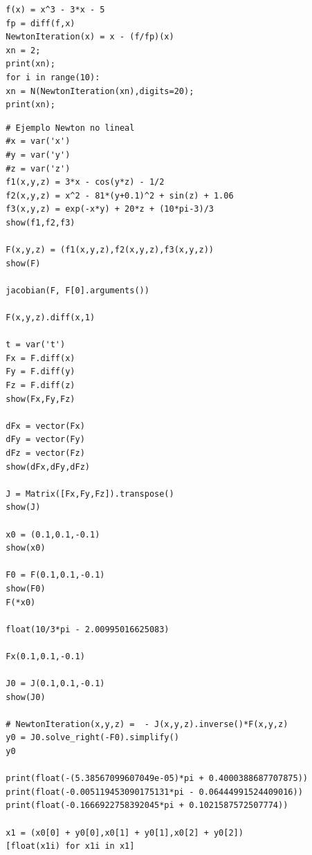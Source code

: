\begin{example}

	\begin{verbatim}
		f(x) = x^3 - 3*x - 5
		fp = diff(f,x)
		NewtonIteration(x) = x - (f/fp)(x)
		xn = 2;
		print(xn);
		for i in range(10):
		xn = N(NewtonIteration(xn),digits=20);
		print(xn);
	\end{verbatim}

\end{example}

\begin{example}
	
	\begin{verbatim}
		# Ejemplo Newton no lineal
		#x = var('x')
		#y = var('y')
		#z = var('z')
		f1(x,y,z) = 3*x - cos(y*z) - 1/2
		f2(x,y,z) = x^2 - 81*(y+0.1)^2 + sin(z) + 1.06
		f3(x,y,z) = exp(-x*y) + 20*z + (10*pi-3)/3
		show(f1,f2,f3)
		
		F(x,y,z) = (f1(x,y,z),f2(x,y,z),f3(x,y,z))
		show(F)
		
		jacobian(F, F[0].arguments())
		
		F(x,y,z).diff(x,1)
		
		t = var('t')
		Fx = F.diff(x)
		Fy = F.diff(y)
		Fz = F.diff(z)
		show(Fx,Fy,Fz)
		
		dFx = vector(Fx)
		dFy = vector(Fy)
		dFz = vector(Fz)
		show(dFx,dFy,dFz)
		
		J = Matrix([Fx,Fy,Fz]).transpose()
		show(J)
		
		x0 = (0.1,0.1,-0.1)
		show(x0)
		
		F0 = F(0.1,0.1,-0.1)
		show(F0)
		F(*x0)
		
		float(10/3*pi - 2.00995016625083)
		
		Fx(0.1,0.1,-0.1)
		
		J0 = J(0.1,0.1,-0.1)
		show(J0)
		
		# NewtonIteration(x,y,z) =  - J(x,y,z).inverse()*F(x,y,z)
		y0 = J0.solve_right(-F0).simplify()
		y0
		
		print(float(-(5.38567099607049e-05)*pi + 0.4000388687707875))
		print(float(-0.005119453090175131*pi - 0.06444991524409016))
		print(float(-0.1666922758392045*pi + 0.1021587572507774))
		
		x1 = (x0[0] + y0[0],x0[1] + y0[1],x0[2] + y0[2])
		[float(x1i) for x1i in x1]

	\end{verbatim}
	
\end{example}



